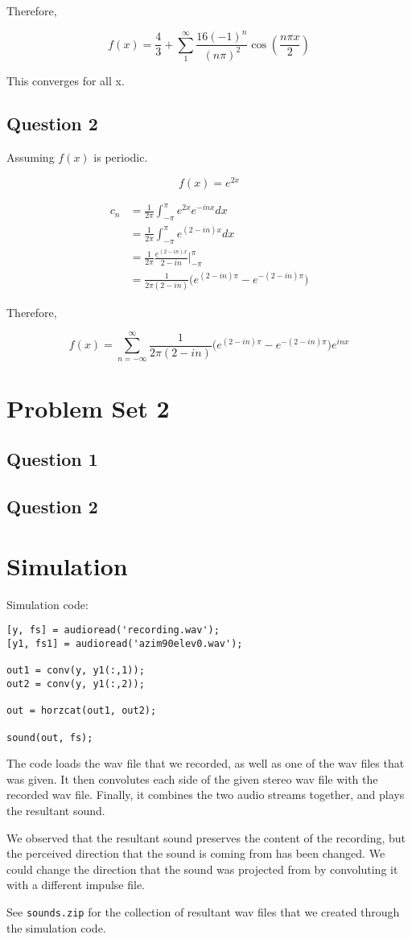 \documentclass[titlepage]{article}
\begin{document}
Therefore,

$$f(x) = \frac{4}{3} + \sum_1^{\infty} \frac{16 (-1)^n}{(n\pi)^2}\cos(\frac{n\pi x}{2})$$

This converges for all x.
\subsection*{Question 2}

Assuming $f(x)$ is periodic.

$$f(x) = e^{2x}$$

\begin{align*}
    c_n &= \frac{1}{2\pi} \int_{-\pi}^{\pi} e^{2x}e^{-inx} dx
    \\ &= \frac{1}{2\pi} \int_{-\pi}^{\pi} e^{(2 - in)x} dx
    \\ &= \frac{1}{2\pi} \frac{e^{(2 - in)x}}{2 - in} \bigg|_{-\pi}^{\pi}
    \\ &= \frac{1}{2\pi(2 - in)}\bigg(e^{(2 - in)\pi} - e^{-(2 - in)\pi}\bigg)
\end{align*}

Therefore,

$$f(x) = \sum_{n=-\infty}^{\infty} \frac{1}{2\pi(2 - in)}\bigg(e^{(2 - in)\pi} - e^{-(2 - in)\pi}\bigg) e^{inx}$$
\section*{Problem Set 2}
\subsection*{Question 1}
\subsection*{Question 2}

\section*{Simulation}

Simulation code:

\begin{verbatim}
[y, fs] = audioread('recording.wav');
[y1, fs1] = audioread('azim90elev0.wav');

out1 = conv(y, y1(:,1));
out2 = conv(y, y1(:,2));

out = horzcat(out1, out2);

sound(out, fs);
\end{verbatim}

The code loads the wav file that we recorded, as well as one of the wav files that was given.
It then convolutes each side of the given stereo wav file with the recorded wav file.
Finally, it combines the two audio streams together, and plays the resultant sound.

We observed that the resultant sound preserves the content of the recording, but
the perceived direction that the sound is coming from has been changed. We could
change the direction that the sound was projected from by convoluting it with
a different impulse file.

See \texttt{sounds.zip} for the collection of resultant wav files that we created
through the simulation code.
\end{document}
